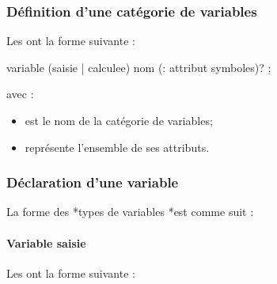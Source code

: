 \documentclass[letterpaper,10pt,french]{sphinxmanual}
\begin{document}
\subsubsection{Définition d’une catégorie de variables}
\label{\detokenize{syntax:definition-d-une-categorie-de-variables}}
\sphinxAtStartPar
Les  ont la forme suivante :

\begin{sphinxVerbatim}[commandchars=\\\{\}]
variable (saisie | calculee) \PYGZlt{}nom\PYGZgt{} (: attribut \PYGZlt{}symboles\PYGZgt{})? ;
\end{sphinxVerbatim}

\sphinxAtStartPar
avec :
\begin{itemize}
\item {} 
\sphinxAtStartPar
{} est le nom de la catégorie de variables;

\item {} 
\sphinxAtStartPar
{} représente l’ensemble de ses attributs.

\end{itemize}


\subsubsection{Déclaration d’une variable}
\label{\detokenize{syntax:declaration-d-une-variable}}
\sphinxAtStartPar
La forme des *types de variables *est comme suit :

\begin{sphinxVerbatim}[commandchars=\\\{\}]
             
\end{sphinxVerbatim}


\paragraph{Variable saisie}
\label{\detokenize{syntax:variable-saisie}}
\sphinxAtStartPar
Les  ont la forme suivante :
\end{document}

